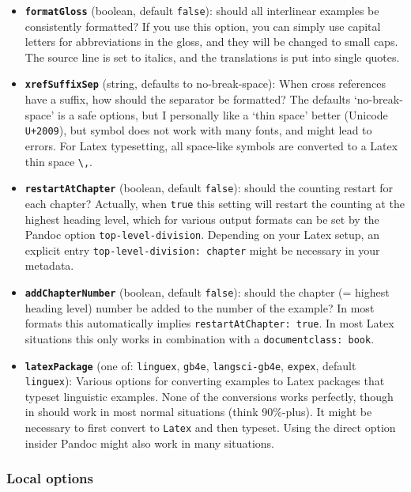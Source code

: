 \documentclass[
]{article}
\providecommand{\tightlist}{%
  \setlength{\itemsep}{0pt}\setlength{\parskip}{0pt}}
\begin{document}
\begin{itemize}
\tightlist
\item
  \textbf{\texttt{formatGloss}} (boolean, default \texttt{false}):
  should all interlinear examples be consistently formatted? If you use
  this option, you can simply use capital letters for abbreviations in
  the gloss, and they will be changed to small caps. The source line is
  set to italics, and the translations is put into single quotes.
\item
  \textbf{\texttt{xrefSuffixSep}} (string, defaults to no-break-space):
  When cross references have a suffix, how should the separator be
  formatted? The defaults `no-break-space' is a safe options, but I
  personally like a `thin space' better (Unicode \texttt{U+2009}), but
  symbol does not work with many fonts, and might lead to errors. For
  Latex typesetting, all space-like symbols are converted to a Latex
  thin space \texttt{\textbackslash{},}.
\item
  \textbf{\texttt{restartAtChapter}} (boolean, default \texttt{false}):
  should the counting restart for each chapter? Actually, when
  \texttt{true} this setting will restart the counting at the highest
  heading level, which for various output formats can be set by the
  Pandoc option \texttt{top-level-division}. Depending on your Latex
  setup, an explicit entry \texttt{top-level-division:\ chapter} might
  be necessary in your metadata.
\item
  \textbf{\texttt{addChapterNumber}} (boolean, default \texttt{false}):
  should the chapter (= highest heading level) number be added to the
  number of the example? In most formats this automatically implies
  \texttt{restartAtChapter:\ true}. In most Latex situations this only
  works in combination with a \texttt{documentclass:\ book}.
\item
  \textbf{\texttt{latexPackage}} (one of: \texttt{linguex},
  \texttt{gb4e}, \texttt{langsci-gb4e}, \texttt{expex}, default
  \texttt{linguex}): Various options for converting examples to Latex
  packages that typeset linguistic examples. None of the conversions
  works perfectly, though in should work in most normal situations
  (think 90\%-plus). It might be necessary to first convert to
  \texttt{Latex} and then typeset. Using the direct option insider
  Pandoc might also work in many situations.
\end{itemize}

\hypertarget{local-options}{%
\subsubsection{Local options}\label{local-options}}
\end{document}
